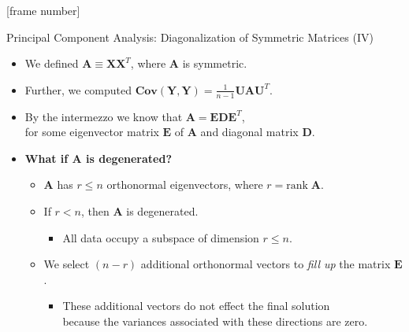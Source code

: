 \documentclass[aspectratio=169,t]{beamer}
\begin{document}
  {
    [frame number]
    \begin{frame}{Principal Component Analysis: Diagonalization of Symmetric Matrices (IV)}
    \begin{itemize}
      \item We defined $\mathbf{A} \equiv \mathbf{X}\mathbf{X}^T$, where $\mathbf{A}$ is symmetric.
      \item Further, we computed $\textbf{Cov}(\mathbf{Y},\mathbf{Y}) = \frac{1}{n-1} \mathbf{UAU}^T$.
      \item By the intermezzo we know that $\mathbf{A} = \mathbf{EDE}^T$, \\
      for some eigenvector matrix $\mathbf{E}$ of $\mathbf{A}$ and diagonal matrix $\mathbf{D}$.
      \item \textbf{What if $\mathbf{A}$ is degenerated?}
      \begin{itemize}
        \item $\mathbf{A}$ has $r \leq n$ orthonormal eigenvectors, where $r = \text{rank} \; \mathbf{A}$.
        \item If $r < n$, then $\mathbf{A}$ is degenerated.
        \begin{itemize}
          \item All data occupy a subspace of dimension $r \leq n$.
        \end{itemize}
        \item We select $(n-r)$ additional orthonormal vectors to \emph{fill up} the matrix $\mathbf{E}$.
        \begin{itemize}
          \item These additional vectors do not effect the final solution \\
          because the variances associated with these directions are zero.
        \end{itemize}
      \end{itemize}
    \end{itemize}
    \end{frame}
  }
\end{document}
